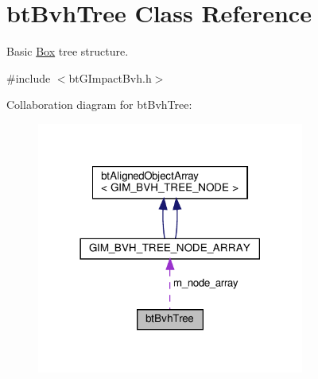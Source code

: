 \hypertarget{classbtBvhTree}{}\section{bt\+Bvh\+Tree Class Reference}
\label{classbtBvhTree}


Basic \hyperlink{classBox}{Box} tree structure.  




{\ttfamily \#include $<$bt\+G\+Impact\+Bvh.\+h$>$}



Collaboration diagram for bt\+Bvh\+Tree\+:
\nopagebreak
\begin{figure}[H]
\begin{center}
\leavevmode
\includegraphics[width=249pt]{classbtBvhTree__coll__graph}
\end{center}
\end{figure}
